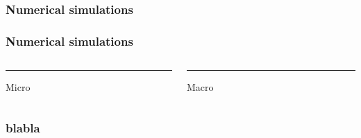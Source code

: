 \documentclass[10pt]{beamer}
\begin{document}
\begin{frame}
\frametitle{Numerical simulations}
\end{frame}


\begin{frame}
\frametitle{Numerical simulations}
\begin{columns}[T] %
	\begin{column}{.48\textwidth}
		\color{orange}\rule{\linewidth}{4pt}
		
		Micro
	\end{column}%
	\hfill%
	\begin{column}{.48\textwidth}
		\color{blue}\rule{\linewidth}{4pt}
		
		Macro
	\end{column}%
\end{columns}
\end{frame}

\begin{frame}
\frametitle{blabla}
\end{frame}




\end{document}
